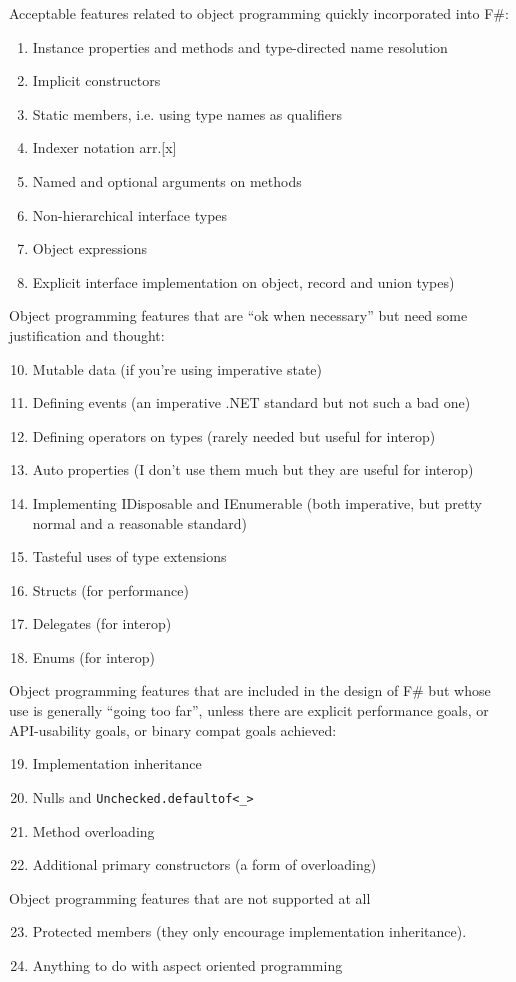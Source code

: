 \documentclass[acmsmall,review]{acmart}\settopmatter{printfolios=true,printccs=false,printacmref=false}
\begin{document}
Acceptable features related to object programming quickly incorporated into F\#:
\begin{enumerate}
\item Instance properties and methods and type-directed name resolution
\item Implicit constructors 
\item Static members, i.e. using type names as qualifiers
\item Indexer notation arr.[x]  
\item Named and optional arguments on methods
\item Non-hierarchical interface types
\item Object expressions 
\item Explicit interface implementation on object, record and union types)
\end{enumerate}
Object programming features that are “ok when necessary” but need some justification and thought: 
\begin{enumerate}
  \setcounter{enumi}{9}
\item Mutable data (if you're using imperative state)
\item Defining events (an imperative .NET standard but not such a bad one)
\item Defining operators on types (rarely needed but useful for interop)
\item Auto properties (I don't use them much but they are useful for interop)
\item Implementing IDisposable and IEnumerable (both imperative, but pretty normal and a reasonable standard)
\item Tasteful uses of type extensions
\item Structs (for performance)
\item Delegates (for interop)
\item Enums (for interop)
\end{enumerate}
Object programming features that are included in the design of F\# but whose use is generally “going too far”, unless there are explicit performance goals, or API-usability goals, or binary compat goals  achieved:
\begin{enumerate}
  \setcounter{enumi}{18}
\item Implementation inheritance
\item Nulls and \texttt{Unchecked.defaultof<\_>}
\item Method overloading
\item Additional primary constructors (a form of overloading)
\end{enumerate}
Object programming features that are not supported at all
\begin{enumerate}
  \setcounter{enumi}{22}
\item Protected members (they only encourage implementation inheritance).
\item Anything to do with aspect oriented programming
\end{enumerate}
\end{document}
